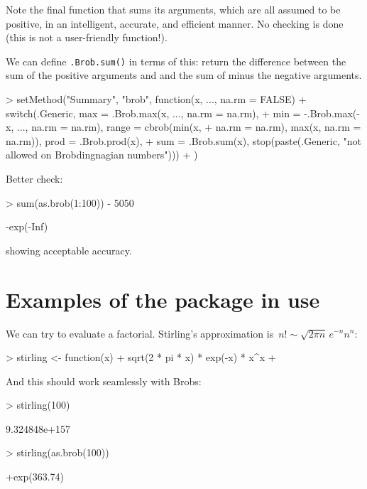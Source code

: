 \documentclass[a4paper]{article}
\begin{document}
Note the final function that sums its arguments, which are all assumed
to be positive, in an intelligent, accurate, and efficient manner.  No
checking is done (this is not a user-friendly function!).

We can define {\tt .Brob.sum()} in terms of this: return the
difference between the sum of the positive arguments and and the sum
of minus the negative arguments.

\begin{Schunk}
\begin{Sinput}
> setMethod("Summary", "brob", function(x, ..., na.rm = FALSE) {
+     switch(.Generic, max = .Brob.max(x, ..., na.rm = na.rm), 
+         min = -.Brob.max(-x, ..., na.rm = na.rm), range = cbrob(min(x, 
+             na.rm = na.rm), max(x, na.rm = na.rm)), prod = .Brob.prod(x), 
+         sum = .Brob.sum(x), stop(paste(.Generic, "not allowed on Brobdingnagian numbers")))
+ })
\end{Sinput}
\end{Schunk}

Better check:

\begin{Schunk}
\begin{Sinput}
> sum(as.brob(1:100)) - 5050
\end{Sinput}
\begin{Soutput}
[1] -exp(-Inf)
\end{Soutput}
\end{Schunk}

showing acceptable accuracy.

\section{Examples of the package in use}

We can try to evaluate a factorial.
Stirling's approximation is~$n!\sim\sqrt{2\pi
  n}\,e^{-n}n^n$:

\begin{Schunk}
\begin{Sinput}
> stirling <- function(x) {
+     sqrt(2 * pi * x) * exp(-x) * x^x
+ }
\end{Sinput}
\end{Schunk}

And this should work seamlessly with Brobs:


\begin{Schunk}
\begin{Sinput}
> stirling(100)
\end{Sinput}
\begin{Soutput}
[1] 9.324848e+157
\end{Soutput}
\begin{Sinput}
> stirling(as.brob(100))
\end{Sinput}
\begin{Soutput}
[1] +exp(363.74)
\end{Soutput}
\end{Schunk}
\end{document}
